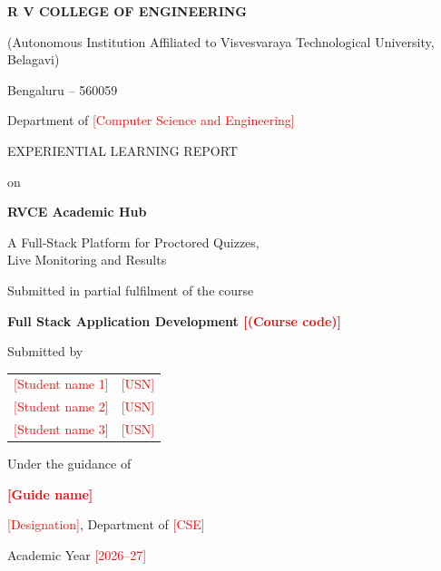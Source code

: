 \documentclass[12pt,a4paper,oneside]{report}
\newcommand{\TODO}[1]{\textcolor{red}{[#1]}}
\newcommand{\appname}{RVCE Academic Hub}
\begin{document}
\begin{titlepage}
  \centering
  {\large\bfseries R V COLLEGE OF ENGINEERING\par}
  {\small (Autonomous Institution Affiliated to Visvesvaraya Technological University, Belagavi)\par}
  {\small Bengaluru -- 560059\par}
  \vspace{1.2cm}
  {\large Department of \TODO{Computer Science and Engineering}\par}
  \vspace{1.5cm}
  {\normalsize EXPERIENTIAL LEARNING REPORT\par}
  {\normalsize on\par}
  \vspace{0.6cm}
  {\LARGE\bfseries \appname\par}
  \vspace{0.3cm}
  {\large A Full-Stack Platform for Proctored Quizzes,\\ Live Monitoring and Results\par}
  \vspace{1.5cm}
  {\normalsize Submitted in partial fulfilment of the course\par}
  {\normalsize\bfseries Full Stack Application Development \TODO{(Course code)}\par}
  \vspace{1.2cm}
  {\normalsize Submitted by\par}
  \vspace{0.3cm}
  \begin{tabular}{ll}
    \TODO{Student name 1} & \TODO{USN} \\
    \TODO{Student name 2} & \TODO{USN} \\
    \TODO{Student name 3} & \TODO{USN} \\
  \end{tabular}
  \vspace{1.2cm}

  {\normalsize Under the guidance of\par}
  {\normalsize\bfseries \TODO{Guide name}\par}
  {\normalsize \TODO{Designation}, Department of \TODO{CSE}\par}
  \vfill
  {\normalsize Academic Year \TODO{2026--27}\par}
\end{titlepage}
\end{document}
